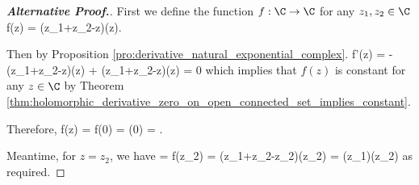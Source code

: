 \begin{proof}[\bf Alternative Proof.]
First we define the function $f:\C\to \C$ for any $z_1,z_2\in \C$
\be
f(z) = \exp(z_1+z_2-z)\cdot \exp(z).
\ee

Then by Proposition \ref{pro:derivative_natural_exponential_complex}.
\be
f'(z) = -\exp(z_1+z_2-z)\cdot \exp(z) + \exp(z_1+z_2-z)\cdot \exp(z) = 0
\ee
which implies that $f(z)$ is constant for any $z\in \C$ by Theorem \ref{thm:holomorphic_derivative_zero_on_open_connected_set_implies_constant}. %


Therefore,
\be
f(z) = f(0) = \exp{}\cdot \exp(0) = \exp{}.
\ee

Meantime, for $z = z_2$, we have
\be
\exp{} = f(z_2) = \exp(z_1+z_2-z_2)\cdot \exp(z_2) = \exp(z_1)\cdot \exp(z_2)
\ee
as required.%
\end{proof}











